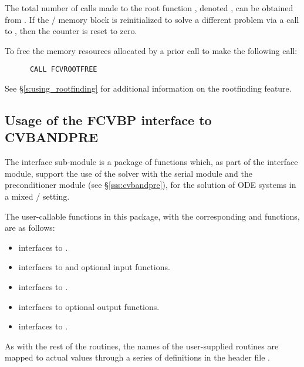 The total number of calls made to the root function ,
denoted , can be obtained from .
If the {\fcvode}/{\cvode} memory block is reinitialized to solve a
different problem via a call to , then the counter
 is reset to zero.

To free the memory resources allocated by a prior call to  make
the following call:
\begin{verbatim}
      CALL FCVROOTFREE
\end{verbatim}
See \S\ref{s:using_rootfinding} for additional information on the
rootfinding feature.

\subsection{Usage of the FCVBP interface to CVBANDPRE}

The {\fcvbp} interface sub-module is a package of {\C} functions which,
as part of the {\fcvode} interface module, support the use of the
{\cvode} solver with the serial {\nvecs} module and the {\cvbandpre} 
preconditioner module (see \S\ref{sss:cvbandpre}), for the solution of 
ODE systems in a mixed {\F}/{\C} setting.  

The user-callable functions in this package, with the corresponding
{\cvode} and {\cvbandpre} functions, are as follows: 
\begin{itemize}
\item {}
  interfaces to .
\item {}
  interfaces to  and {\spgmr} optional input functions.
\item {}
  interfaces to .
\item {}
  interfaces to {\cvbandpre} optional output functions.
\item {}
  interfaces to .
\end{itemize}

As with the rest of the {\fcvode} routines, the names of the user-supplied
routines are mapped to actual values through a series of definitions in the
header file .

